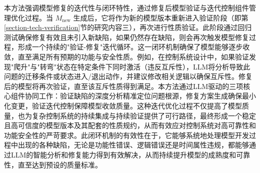 本方法强调模型修复的迭代性与闭环特性，通过修复后模型验证与迭代控制组件管理优化过程。当 $M_{\text{new}}$ 生成后，它将作为新的模型版本重新进入验证阶段（即第\ref{section-tech-verification}节的研究内容三），再次进行性质验证。此阶段通过回归测试确保修复有效且未引入新缺陷，如果仍然存在缺陷，则会再次触发模型修复过程，形成一个持续的"验证-修复"迭代循环。这一闭环机制确保了模型能够逐步收敛，直至满足所有预期的功能与安全性质。例如，在控制系统设计中，如果验证发现"爬升"与"转弯"状态在特定条件下同时激活（违反互斥性），LLM将分析导致此问题的迁移条件或状态进入/退出动作，并建议修改相关逻辑以确保互斥性。修复后的模型将再次验证，直至该互斥性质得到满足。本方法通过LLM驱动的三项核心组件协同工作：验证缺陷的深度分析精准定位问题根源，修复方案生成确保最小化变更，验证迭代控制保障模型收敛质量。这种迭代优化过程不仅提高了模型质量，也为复杂控制系统的持续集成与持续验证提供了可行路径，最终形成一个稳定且高可信度的模型版本及其配套的性质规约，从而有效应对控制系统对高可靠性和功能安全性的严苛要求。此闭环机制的有效性在于，它能够系统地处理模型开发过程中出现的各种缺陷，无论是功能性错误、逻辑错误还是时间属性违规，都能够通过LLM的智能分析和修复能力得到有效解决，从而持续提升模型的成熟度和可靠性，直至达到预设的质量标准。